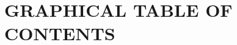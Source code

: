 \documentclass[12pt]{article}
\begin{document}
\begin{center}
\begin{flushleft}

\end{flushleft}
\end{center}


\clearpage

\renewcommand{\baselinestretch}{1.5}
\normalsize

\clearpage

\section*{\sffamily \Large GRAPHICAL TABLE OF CONTENTS} 
%
%
\end{document}
